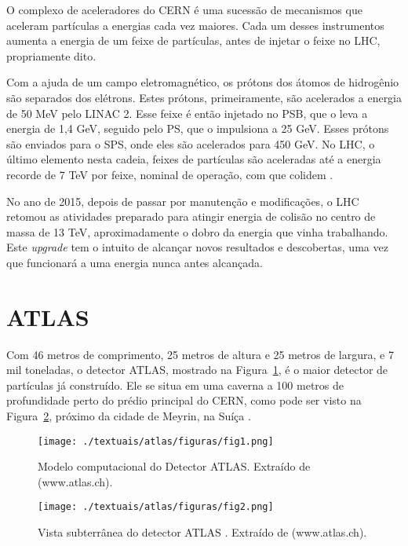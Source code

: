 O complexo de aceleradores do CERN é uma sucessão de mecanismos que aceleram partículas a energias cada vez maiores. Cada um desses instrumentos aumenta a energia de um feixe de partículas, antes de injetar o feixe no LHC, propriamente dito.

Com a ajuda de um campo eletromagnético, os prótons dos átomos de hidrogênio são separados dos elétrons. Estes prótons, primeiramente, são acelerados a energia de 50 MeV pelo \ac{LINAC 2}. Esse feixe é então injetado no \ac{PSB}, que o leva a energia de 1,4 GeV, seguido pelo \ac{PS}, que o impulsiona a 25 GeV. Esses prótons são enviados para o \ac{SPS}, onde eles são acelerados para 450 GeV. No LHC, o último elemento nesta cadeia, feixes de partículas são aceleradas até a energia recorde de 7 TeV por feixe, nominal de operação, com que colidem \cite{cernwebAccelerator}.

%
No ano de 2015, depois de passar por manutenção e modificações, o LHC retomou as atividades preparado para atingir energia de colisão no centro de massa de 13 TeV, aproximadamente o dobro da energia que vinha trabalhando. Este \emph{upgrade} tem o intuito de alcançar novos resultados e descobertas, uma vez que funcionará a uma energia nunca antes alcançada.

\section{ATLAS}\label{sec:ATLAS}

Com 46 metros de comprimento, 25 metros de altura e 25 metros de largura, e 7 mil toneladas, o detector ATLAS, mostrado na Figura~\ref{fig:2T05}, é o maior detector de partículas já construído. Ele se situa em uma caverna a 100 metros de profundidade perto do prédio principal do CERN, como pode ser visto na Figura~\ref{fig:2T06}, próximo da cidade de Meyrin, na Suíça \cite{cernwebAtlas}.

\begin{figure}[!h]
	\centering
	\texttt{[image: ./textuais/atlas/figuras/fig1.png]}\\
	\caption{Modelo computacional do Detector ATLAS. Extraído de (www.atlas.ch).}
	\label{fig:2T05}
\end{figure}

\begin{figure}[!h]
	\centering
	\texttt{[image: ./textuais/atlas/figuras/fig2.png]}\\
	\caption{Vista subterrânea do detector ATLAS . Extraído de (www.atlas.ch).}
	\label{fig:2T06}
\end{figure}

